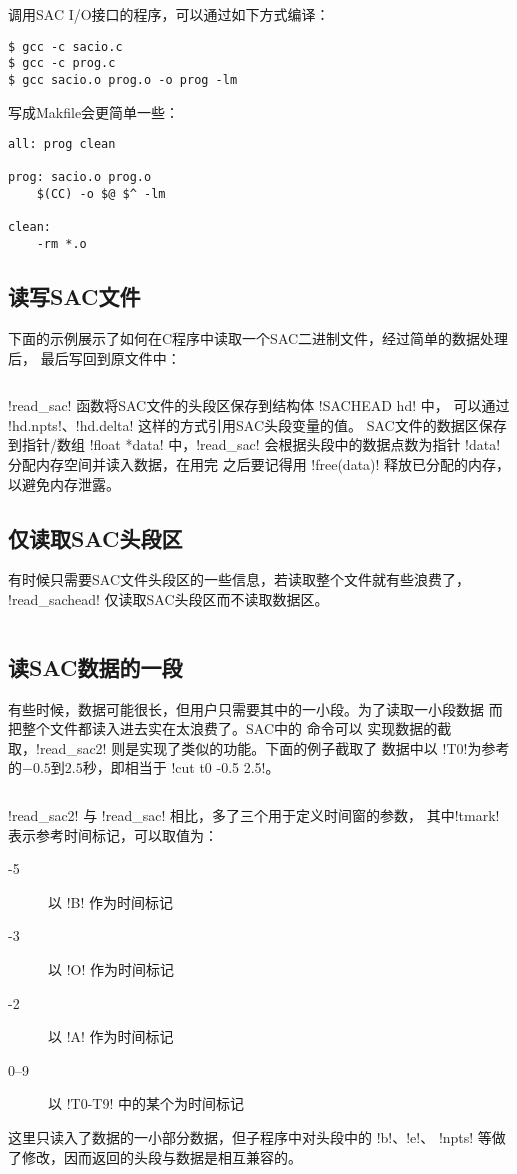 调用SAC I/O接口的程序，可以通过如下方式编译：
\begin{verbatim}
$ gcc -c sacio.c
$ gcc -c prog.c
$ gcc sacio.o prog.o -o prog -lm
\end{verbatim}

写成Makfile会更简单一些：
\begin{verbatim}
all: prog clean

prog: sacio.o prog.o
    $(CC) -o $@ $^ -lm

clean:
    -rm *.o
\end{verbatim}

\subsection{读写SAC文件}
下面的示例展示了如何在C程序中读取一个SAC二进制文件，经过简单的数据处理后，
最后写回到原文件中：
\inputminted{C}{./sacio/readsac.c}
!read_sac! 函数将SAC文件的头段区保存到结构体 !SACHEAD hd! 中，
可以通过 !hd.npts!、!hd.delta! 这样的方式引用SAC头段变量的值。
SAC文件的数据区保存到指针/数组 !float *data! 中，!read_sac!
会根据头段中的数据点数为指针 !data! 分配内存空间并读入数据，在用完
之后要记得用 !free(data)! 释放已分配的内存，以避免内存泄露。

\subsection{仅读取SAC头段区}
有时候只需要SAC文件头段区的一些信息，若读取整个文件就有些浪费了，
!read_sachead! 仅读取SAC头段区而不读取数据区。
\inputminted{C}{./sacio/readsachead.c}

\subsection{读SAC数据的一段}
有些时候，数据可能很长，但用户只需要其中的一小段。为了读取一小段数据
而把整个文件都读入进去实在太浪费了。SAC中的  命令可以
实现数据的截取，!read_sac2! 则是实现了类似的功能。下面的例子截取了
数据中以 !T0!为参考的$-0.5$到$2.5$秒，即相当于 !cut t0 -0.5 2.5!。
\inputminted{C}{./sacio/readsac2.c}
!read_sac2! 与 !read_sac! 相比，多了三个用于定义时间窗的参数，
其中!tmark! 表示参考时间标记，可以取值为：
\begin{description}
\item[-5] 以 !B! 作为时间标记
\item[-3] 以 !O! 作为时间标记
\item[-2] 以 !A! 作为时间标记
\item[0--9] 以 !T0-T9! 中的某个为时间标记
\end{description}
这里只读入了数据的一小部分数据，但子程序中对头段中的 !b!、!e!、
!npts! 等做了修改，因而返回的头段与数据是相互兼容的。

